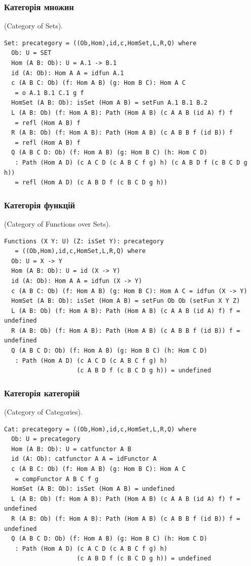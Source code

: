 \begin{definition}
\subsubsection{Категорія множин}
\begin{definition} (Category of Sets).
\begin{lstlisting}
Set: precategory = ((Ob,Hom),id,c,HomSet,L,R,Q) where
  Ob: U = SET
  Hom (A B: Ob): U = A.1 -> B.1
  id (A: Ob): Hom A A = idfun A.1
  c (A B C: Ob) (f: Hom A B) (g: Hom B C): Hom A C
   = o A.1 B.1 C.1 g f
  HomSet (A B: Ob): isSet (Hom A B) = setFun A.1 B.1 B.2
  L (A B: Ob) (f: Hom A B): Path (Hom A B) (c A A B (id A) f) f
   = refl (Hom A B) f
  R (A B: Ob) (f: Hom A B): Path (Hom A B) (c A B B f (id B)) f
   = refl (Hom A B) f
  Q (A B C D: Ob) (f: Hom A B) (g: Hom B C) (h: Hom C D)
   : Path (Hom A D) (c A C D (c A B C f g) h) (c A B D f (c B C D g h))
   = refl (Hom A D) (c A B D f (c B C D g h))
\end{lstlisting}
\end{definition}

\subsubsection{Категорія функцій}
\begin{definition} (Category of Functions over Sets).
\begin{lstlisting}
Functions (X Y: U) (Z: isSet Y): precategory
   = ((Ob,Hom),id,c,HomSet,L,R,Q) where
  Ob: U = X -> Y
  Hom (A B: Ob): U = id (X -> Y)
  id (A: Ob): Hom A A = idfun (X -> Y)
  c (A B C: Ob) (f: Hom A B) (g: Hom B C): Hom A C = idfun (X -> Y)
  HomSet (A B: Ob): isSet (Hom A B) = setFun Ob Ob (setFun X Y Z)
  L (A B: Ob) (f: Hom A B): Path (Hom A B) (c A A B (id A) f) f = undefined
  R (A B: Ob) (f: Hom A B): Path (Hom A B) (c A B B f (id B)) f = undefined
  Q (A B C D: Ob) (f: Hom A B) (g: Hom B C) (h: Hom C D)
   : Path (Hom A D) (c A C D (c A B C f g) h)
                    (c A B D f (c B C D g h)) = undefined
\end{lstlisting}
\end{definition}

\subsubsection{Категорія категорій}
\begin{definition} (Category of Categories).
\begin{lstlisting}
Cat: precategory = ((Ob,Hom),id,c,HomSet,L,R,Q) where
  Ob: U = precategory
  Hom (A B: Ob): U = catfunctor A B
  id (A: Ob): catfunctor A A = idFunctor A
  c (A B C: Ob) (f: Hom A B) (g: Hom B C): Hom A C
   = compFunctor A B C f g
  HomSet (A B: Ob): isSet (Hom A B) = undefined
  L (A B: Ob) (f: Hom A B): Path (Hom A B) (c A A B (id A) f) f = undefined
  R (A B: Ob) (f: Hom A B): Path (Hom A B) (c A B B f (id B)) f = undefined
  Q (A B C D: Ob) (f: Hom A B) (g: Hom B C) (h: Hom C D)
   : Path (Hom A D) (c A C D (c A B C f g) h)
                    (c A B D f (c B C D g h)) = undefined
\end{lstlisting}
\end{definition}


\end{definition}
